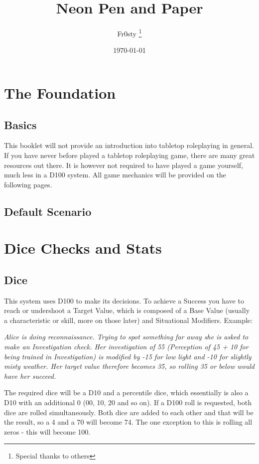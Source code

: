\documentclass[12pt,a4paper]{book}
\title{Neon Pen and Paper}
\author{Fr0sty \thanks{Special thanks to others}}
\date{\today}
\newenvironment{exampleblock}[1][1]
{\hfill\begin{minipage}{\dimexpr\textwidth-#1cm}}
{\end{minipage}}
\begin{document}
	\maketitle
	\tableofcontents
	
	\chapter{The Foundation}
	\section{Basics}
	This booklet will not provide an introduction into tabletop roleplaying in general. If you have never before played a tabletop roleplaying game, there are many great resources out there. It is however not required to have played a game yourself, much less in a D100 system. All game mechanics will be provided on the following pages.
	\section{Default Scenario}
	
	\chapter{Dice Checks and Stats}
	\section{Dice}
	This system uses D100 to make its decisions. To achieve a Success you have to reach or undershoot a Target Value, which is composed of a Base Value (usually a characteristic or skill, more on those later) and Situational Modifiers. Example:
	
	\begin{exampleblock}
		\textit{Alice is doing reconnaissance. Trying to spot something far away she is asked to make an Investigation check. Her investigation of 55 (Perception of 45 + 10 for being trained in Investigation) is modified by -15 for low light and -10 for slightly misty weather. Her target value therefore becomes 35, so rolling 35 or below would have her succeed.}
	\end{exampleblock}

	The required dice will be a D10 and a percentile dice, which essentially is also a D10 with an additional 0 (00, 10, 20 and so on). If a D100 roll is requested, both dice are rolled simultaneously. Both dice are added to each other and that will be the result, so a 4 and a 70 will become 74. The one exception to this is rolling all zeros - this will become 100.
\end{document}
